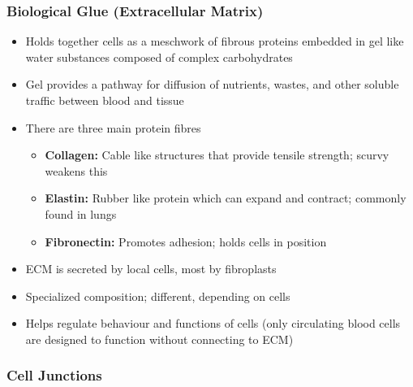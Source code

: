 \documentclass[11pt]{article}
\begin{document}
\subsubsection{Biological Glue (Extracellular Matrix)}
\begin{itemize}
\item Holds together cells as a meschwork of fibrous proteins embedded in gel like water substances composed of complex carbohydrates
\item Gel provides a pathway for diffusion of nutrients, wastes, and other soluble traffic between blood and tissue
\item There are three main protein fibres
\begin{itemize}
\item \textbf{Collagen: }Cable like structures that provide tensile strength; scurvy weakens this
\item \textbf{Elastin: }Rubber like protein which can expand and contract; commonly found in lungs
\item \textbf{Fibronectin:} Promotes adhesion; holds cells in position
\end{itemize}
\item ECM is secreted by local cells, most by fibroplasts
\item Specialized composition; different, depending on cells 
\item Helps regulate behaviour and functions of cells (only circulating blood cells are designed to function without connecting to ECM)
\end{itemize}

\subsubsection{Cell Junctions}
\end{document}
